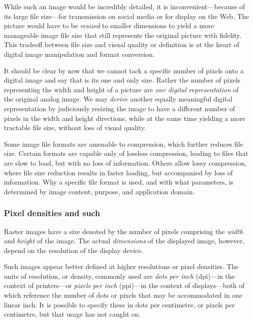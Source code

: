 \documentclass[
  a4paper,
]{article}
\begin{document}
While such an image would be incredibly detailed, it is
inconvenient---because of its large file size---for transmission on
social media or for display on the Web. The picture would have to be
\emph{resized} to smaller dimensions to yield a more manageable image
file size that still represents the original picture with fidelity. This
tradeoff between file size and visual quality or definition is at the
heart of digital image manipulation and format conversion.

It should be clear by now that we cannot tack a specific number of
pixels onto a digital image and say that is its one and only size.
Rather the number of pixels representing the width and height of a
picture are \emph{one digital representation} of the original analog
image. We may \emph{derive} another equally meaningful digital
representation by judiciously resizing the image to have a different
number of pixels in the width and height directions, while at the same
time yielding a more tractable file size, without loss of visual
quality.

Some image file formats are amenable to compression, which further
reduces file size. Certain formats are capable only of lossless
compression, leading to files that are slow to load, but with no loss of
information. Others allow lossy compression, where file size reduction
results in faster loading, but accompanied by loss of information. Why a
specific file format is used, and with what parameters, is determined by
image content, purpose, and application domain.

\hypertarget{pixel-densities-and-such}{%
\subsubsection{Pixel densities and
such}\label{pixel-densities-and-such}}

Raster images have a size denoted by the number of pixels comprising the
\emph{width} and \emph{height} of the image. The actual
\emph{dimensions} of the displayed image, however, depend on the
resolution of the display device.

Such images appear better defined at higher resolutions or pixel
densities. The units of resolution, or density, commonly used are
\emph{dots per inch} (dpi)---in the context of printers---or
\emph{pixels per inch} (ppi)---in the context of displays---both of
which reference the number of dots or pixels that may be accommodated in
one linear inch. It is possible to specify these in dots per centimetre,
or pixels per centimetre, but that usage has not caught on.
\end{document}
